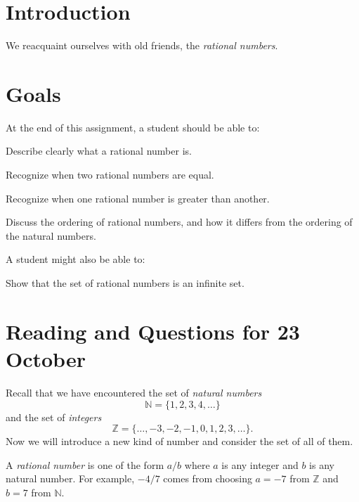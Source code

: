 \documentclass[12pt,letterpaper]{article}
\theoremstyle{definition}
\begin{document}
\setlength{\parskip}{1ex plus 0.5ex minus 0.2ex}
\setlength{\parindent}{0pt}

\pagestyle{fancy}
\cfoot{}

\section*{Introduction}
We reacquaint ourselves with old friends, the \emph{rational numbers}.

\section*{Goals}
At the end of this assignment, a student should be able to:
\begin{compactitem}
\item Describe clearly what a rational number is.
\item Recognize when two rational numbers are equal.
\item Recognize when one rational number is greater than another.
\item Discuss the ordering of rational numbers, and how it differs from the ordering of the natural numbers.
\end{compactitem}
A student might also be able to:
\begin{compactitem}
\item Show that the set of rational numbers is an infinite set.
\end{compactitem}

\section*{Reading and Questions for 23 October}

Recall that we have encountered the set of \emph{natural numbers}
\[
\mathbb{N} = \{1, 2, 3, 4, \ldots\}
\]
and the set of \emph{integers}
\[
\mathbb{Z} = \{ \ldots, -3, -2, -1, 0, 1, 2, 3, \ldots\}.
\]
Now we will introduce a new kind of number and consider the set of all of them.

A \emph{rational number} is one of the form $a/b$ where $a$ is any integer and $b$ is any natural number. 
For example, $-4/7$ comes from choosing $a = -7$ from $\mathbb{Z}$ and $b= 7$ from $\mathbb{N}$.
\end{document}
